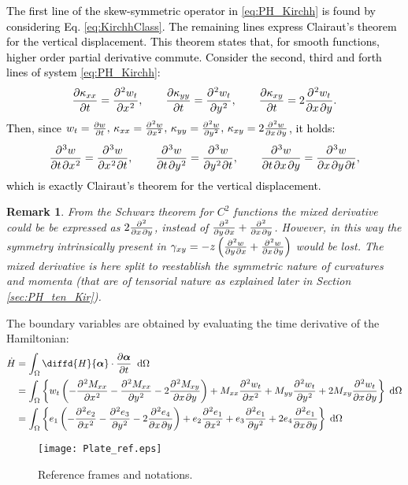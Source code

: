 \documentclass[11pt]{article}
\newtheorem{remark}{Remark}
\newcommand{\revOne}[1]{\textcolor{black}{#1}}
\begin{document}
	\revOne{ The first line of the skew-symmetric operator in \eqref{eq:PH_Kirchh} is found by considering Eq. \eqref{eq:KirchhClass}. The remaining lines express Clairaut’s theorem for the vertical displacement. This theorem states that, for smooth functions, higher order partial derivative commute. Consider the second, third and forth lines of system \eqref{eq:PH_Kirchh}:
		\[ \diffp{\kappa_{xx}}{t} = \diffp[2]{w_t}{x}, \qquad \diffp{\kappa_{yy}}{t} = \diffp[2]{w_t}{y}, \qquad  \diffp{\kappa_{xy}}{t} = 2 \diffp{w_t}{x,y}.
		\] Then, since $w_t = \diffp{w}{t}, \, \kappa_{xx} = \diffp[2]{w}{x}, \, \kappa_{yy} = \diffp[2]{w}{y}, \, \kappa_{xy} = 2 \diffp{w}{x, y}$, it holds:
		\[ \diffp[1,2]{w}{t,x} = \diffp[2,1]{w}{x,t}, \qquad \diffp[1,2]{w}{t,y} = \diffp[2,1]{w}{y,t}, \qquad  \diffp{w}{t,x,y} = \diffp{w}{x,y,t},  
		\] 
		which is exactly Clairaut’s theorem for the vertical displacement.
	}
	\begin{remark}
		From the Schwarz theorem for $C^2$ functions the mixed derivative could be be expressed as $2 \diffp{}{x,y}$, instead of $\diffp{}{y,x} + \diffp{}{x,y}$. However, in this way the symmetry intrinsically present in $\gamma_{xy} = -z \left( \diffp{w}{y,x} + \diffp{w}{x,y} \right)$ would be lost. The mixed derivative is here split to reestablish the symmetric nature of curvatures and momenta (that are of tensorial nature as explained later in Section \ref{sec:PH_ten_Kir}).
	\end{remark}
	The boundary variables are obtained by evaluating the time derivative of the Hamiltonian:
	\begin{align*}
	\dot{H} &= \int_\Omega \diffd{H}{\bm{\alpha}}   \cdot \diffp{\bm{\alpha}}{t} \; \d{\Omega} \\
	&= \int_\Omega \left\{ w_t \left(-\diffp[2]{M_{xx}}{x} -\diffp[2]{M_{xx}}{y} - 2 \diffp{M_{xy}}{x,y} \right) + M_{xx} \diffp[2]{w_t}{x} + M_{yy} \diffp[2]{w_t}{y} + 2 M_{xy} \diffp{w_t}{x,y} \right\} \d{\Omega} \\
	&= \int_\Omega \left\{ e_1 \left(-\diffp[2]{e_2}{x} -\diffp[2]{e_3}{y} - 2 \diffp{e_4}{x,y}\right) + e_2 \diffp[2]{e_1}{x} + e_3 \diffp[2]{e_1}{y} + 2 e_4 \diffp{e_1}{x,y}  \right\} \d{\Omega}
	\end{align*}
	
	\begin{figure}[t]
		\centering
		\texttt{[image: Plate\_ref.eps]}
		\caption{Reference frames and notations.}
		\label{fig:plate_ref}
	\end{figure}
	
\end{document}
